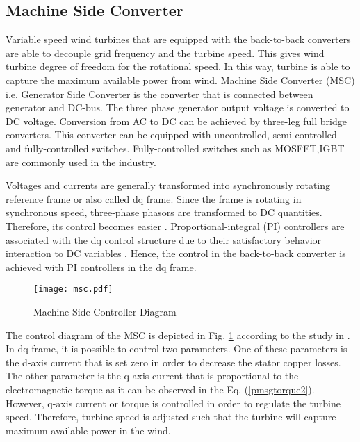 \subsection{Machine Side Converter}
Variable speed wind turbines that are equipped with the back-to-back converters are able to decouple grid frequency and the turbine speed. This gives wind turbine degree of freedom for the rotational speed. In this way, turbine is able to capture the maximum available power from wind. Machine Side Converter (MSC) i.e. Generator Side Converter is the converter that is connected between generator and DC-bus. The three phase generator output voltage is converted to DC voltage. Conversion from AC to DC can be achieved by three-leg full bridge converters. This converter can be equipped with uncontrolled, semi-controlled and fully-controlled switches. Fully-controlled switches such as MOSFET,IGBT are commonly used in the industry.\par
Voltages and currents are generally transformed into synchronously rotating reference frame or also called dq frame. Since the frame is rotating in synchronous speed, three-phase phasors are transformed to DC quantities. Therefore, its control becomes easier \cite{Kazmierkowski2002}. Proportional-integral (PI) controllers are associated with the dq control structure due to their satisfactory behavior interaction to DC variables \cite{Blaabjerg2006a}. Hence, the control in the back-to-back converter is achieved with PI controllers in the dq frame. \par
\begin{figure}[h!]
	\centering
	\texttt{[image: msc.pdf]}
	\caption{Machine Side Controller Diagram}
	\label{msc}
\end{figure}
The control diagram of the MSC is depicted in Fig. \ref{msc} according to the study in \cite{Chinchilla2006}. In dq frame, it is possible to control two parameters. One of these parameters is the d-axis current that is set zero in order to decrease the stator copper losses. The other parameter is the q-axis current that is proportional to the electromagnetic torque as it can be observed in the Eq. (\ref{pmsgtorque2}). However, q-axis current or torque is controlled in order to regulate the turbine speed. Therefore, turbine speed is adjusted such that the turbine will capture maximum available power in the wind. 
